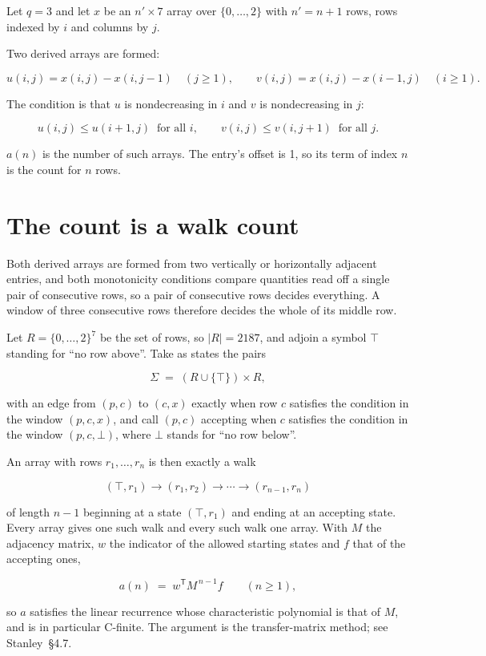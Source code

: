 \documentclass[11pt]{article}
\theoremstyle{definition}
\begin{document}
Let $q = 3$ and let $x$ be an $n' \times 7$ array over $\{0,\dots,2\}$ with $n' = n + 1$ rows, rows indexed by $i$ and columns by $j$.

Two derived arrays are formed:

\[u(i,j) = x(i,j) - x(i,j{-}1)\quad (j \ge 1), \qquad v(i,j) = x(i,j) - x(i{-}1,j)\quad (i \ge 1).\]

The condition is that $u$ is nondecreasing in $i$ and $v$ is nondecreasing in $j$:

\[u(i,j) \le u(i{+}1,j) \ \text{ for all } i, \qquad v(i,j) \le v(i,j{+}1) \ \text{ for all } j.\]

$a(n)$ is the number of such arrays. The entry's offset is 1, so its term of index $n$ is the count for $n$ rows.

\section{The count is a walk count}

Both derived arrays are formed from two vertically or horizontally adjacent entries, and both monotonicity conditions compare quantities read off a single pair of consecutive rows, so a pair of consecutive rows decides everything. A window of three consecutive rows therefore decides the whole of its middle row.

Let $R = \{0,\dots,2\}^{7}$ be the set of rows, so $|R| = 2187$, and adjoin a symbol $\top$ standing for ``no row above''. Take as states the pairs

\[\Sigma \;=\; (R \cup \{\top\}) \times R,\]

with an edge from $(p,c)$ to $(c,x)$ exactly when row $c$ satisfies the condition in the window $(p,c,x)$, and call $(p,c)$ accepting when $c$ satisfies the condition in the window $(p,c,\bot)$, where $\bot$ stands for ``no row below''.

An array with rows $r_1,\dots,r_n$ is then exactly a walk

\[(\top,r_1) \to (r_1,r_2) \to \cdots \to (r_{n-1},r_n)\]

of length $n-1$ beginning at a state $(\top,r_1)$ and ending at an accepting state. Every array gives one such walk and every such walk one array. With $M$ the adjacency matrix, $w$ the indicator of the allowed starting states and $f$ that of the accepting ones,

\[a(n) \;=\; w^{\mathsf T} M^{\,n-1} f \qquad (n \ge 1),\]

so $a$ satisfies the linear recurrence whose characteristic polynomial is that of $M$, and is in particular C-finite. The argument is the transfer-matrix method; see Stanley~\S4.7.
\end{document}
